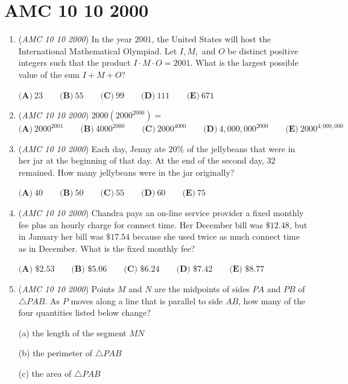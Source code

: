 \section{AMC 10 10 2000}
        \begin{enumerate}
        	\item (\textit{AMC 10 10 2000}) In the year $2001$, the United States will host the International Mathematical Olympiad. Let $I, M,$ and $O$ be distinct positive integers such that the product $I\cdot M \cdot O=2001$. What is the largest possible value of the sum $I+M+O$?


 $\textbf{(A)}\ 23 \qquad\textbf{(B)}\ 55 \qquad\textbf{(C)}\ 99 \qquad\textbf{(D)}\ 111 \qquad\textbf{(E)}\ 671$


	\item (\textit{AMC 10 10 2000}) $2000({2000}^{2000}) =$
$\textbf{(A)}\ {2000}^{2001} \qquad \textbf{(B)}\ {4000}^{2000} \qquad \textbf{(C)}\ {2000}^{4000} \qquad \textbf{(D)}\ {4,000,000}^{2000} \qquad\textbf{(E)}\ {2000}^{4,000,000}$


	\item (\textit{AMC 10 10 2000}) Each day, Jenny ate $20\%$ of the jellybeans that were in her jar at the beginning of that day. At the end of the second day, $32$ remained. How many jellybeans were in the jar originally?


 $\textbf{(A)}\ 40 \qquad\textbf{(B)}\ 50 \qquad\textbf{(C)}\ 55 \qquad\textbf{(D)}\ 60 \qquad\textbf{(E)}\ 75$


	\item (\textit{AMC 10 10 2000}) Chandra pays an on-line service provider a fixed monthly fee plus an hourly charge for connect time. Her December bill was $\$12.48$, but in January her bill was $\$17.54$ because she used twice as much connect time as in December. What is the fixed monthly fee?


 $\textbf{(A) } \$2.53 \qquad\textbf{(B) } \$5.06 \qquad\textbf{(C) } \$6.24 \qquad\textbf{(D) } \$7.42 \qquad\textbf{(E) } \$8.77$


	\item (\textit{AMC 10 10 2000}) Points $M$ and $N$ are the midpoints of sides $PA$ and $PB$ of $\triangle PAB$. As $P$ moves along a line that is parallel to side $AB$, how many of the four quantities listed below change?


 (a) the length of the segment $MN$


 (b) the perimeter of $\triangle PAB$


 (c) the area of $\triangle PAB$



\end{enumerate}
